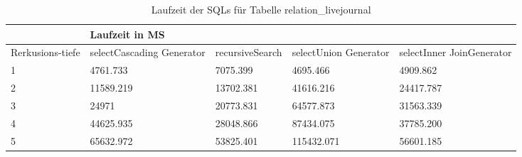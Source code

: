 \begin{table}[H]
	\begin{tabular}{l|l|l|l|l|l|}
		\cline{2-6}
		& \multicolumn{5}{|l|}{Laufzeit in MS}                                                                                                                                                  \\ \hline
		\multicolumn{1}{|l|}{\multirow{2}{2cm}{Rerkusions-tiefe}} & \multicolumn{2}{|l|}{\multirow{2}{3cm}{selectCascading Generator}} & \multirow{2}{2.8cm}{recursiveSearch} & \multirow{2}{2.5cm}{selectUnion Generator} & \multirow{2}{2.5cm}{selectInner JoinGenerator} \\
		\multicolumn{1}{|l|}{}
		& \multicolumn{2}{|l|}{}                                           &                                  &                                     &                                           \\ \hline
		\multicolumn{1}{|l|}{1}                                 & \multicolumn{2}{l|}{4761.733}                                    & 7075.399                                              & 4695.466                                                  & 4909.862                                                        \\ \hline
		\multicolumn{1}{|l|}{2}                                 & \multicolumn{2}{l|}{11589.219}                                   & 13702.381                                             & 41616.216                                                 & 24417.787                                                       \\ \hline
		\multicolumn{1}{|l|}{3}                                 & \multicolumn{2}{l|}{24971}                                       & 20773.831                                             & 64577.873                                                 & 31563.339                                                       \\ \hline
		\multicolumn{1}{|l|}{4}                                 & \multicolumn{2}{l|}{44625.935}                                   & 28048.866                                             & 87434.075                                                 & 37785.200                                                       \\ \hline
		\multicolumn{1}{|l|}{5}                                 & \multicolumn{2}{l|}{65632.972}                                   & 53825.401                                             & 115432.071                                                & 56601.185                                                       \\ \hline
		
	\end{tabular}
	\caption{Laufzeit der SQLs für Tabelle relation\_livejournal}
	\label{2.relationlivejournal.table}
\end{table}


